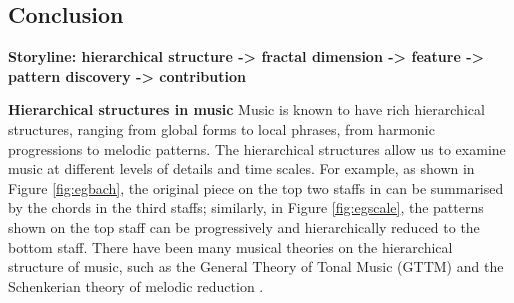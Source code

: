\subsection{Conclusion}



  






\textbf{Storyline: hierarchical structure -> fractal dimension -> feature -> pattern discovery -> contribution }

\textbf{Hierarchical structures in music}
Music is known to have rich hierarchical structures, ranging from global forms to local phrases, from harmonic progressions to melodic patterns. 
The hierarchical structures allow us to examine music at different levels of details and time scales. For example, as shown in Figure \ref{fig:egbach}, the original piece on the top two staffs in can be summarised by the chords in the third staffs; similarly, in Figure \ref{fig:egscale}, the patterns shown on the top staff can be progressively and hierarchically reduced to the bottom staff. 
There have been many musical theories on the hierarchical structure of music, such as the General Theory of Tonal Music (GTTM) \cite{lerdahl1985generative} and the Schenkerian theory of melodic reduction \cite{forte1959schenker}.


